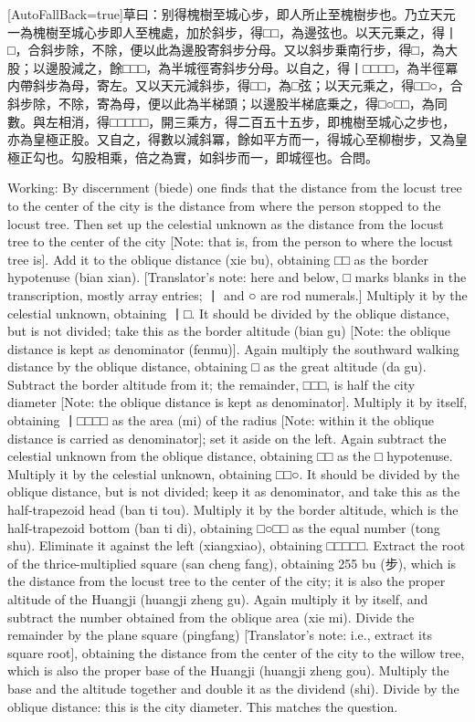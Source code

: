 \documentclass[11pt]{article}
\newcommand{\zhsmall}{\footnotesize\color{black!70}}
\newcommand{\unitlabel}[1]{\marginpar{\raggedleft\tiny\color{gray}#1}}
\newenvironment{unitzh}{\par\CJKfontspec{Noto Serif CJK SC}[AutoFallBack=true]\large\linespread{1.25}\selectfont}{\par}
\newenvironment{uniten}{\par\small\color{black!85}}{\par\medskip}
\begin{document}
\begin{unitzh}\unitlabel{ceyuan-016.1}草曰：别得槐樹至城心步，即人所止至槐樹步也。乃立天元一為槐樹至城心步{\zhsmall 即人至槐處}，加於斜步，得□□，為邊弦也。以天元乗之，得丨□，合斜步除，不除，便以此為邊股{\zhsmall 寄斜步分母}。又以斜步乗南行步，得□，為大股；以邊股減之，餘□□□，為半城徑{\zhsmall 寄斜步分母}。以自之，得丨□□□□，為半徑冪{\zhsmall 内帶斜步為母}，寄左。又以天元減斜歩，得□□，為□弦；以天元乘之，得□□○，合斜步除，不除，寄為母，便以此為半梯頭；以邊股半梯底乗之，得□○□□，為同數。與左相消，得□□□□□，開三乘方，得二百五十五步，即槐樹至城心之步也，亦為皇極正股。又自之，得數以減斜冪，餘如平方而一，得城心至柳樹步，又為皇極正勾也。勾股相乘，倍之為實，如斜步而一，即城徑也。合問。\end{unitzh}
\begin{uniten}Working: By discernment (biede) one finds that the distance from the locust tree to the center of the city is the distance from where the person stopped to the locust tree. Then set up the celestial unknown as the distance from the locust tree to the center of the city [Note: that is, from the person to where the locust tree is]. Add it to the oblique distance (xie bu), obtaining □□ as the border hypotenuse (bian xian). [Translator's note: here and below, □ marks blanks in the transcription, mostly array entries; 丨 and ○ are rod numerals.] Multiply it by the celestial unknown, obtaining 丨□. It should be divided by the oblique distance, but is not divided; take this as the border altitude (bian gu) [Note: the oblique distance is kept as denominator (fenmu)]. Again multiply the southward walking distance by the oblique distance, obtaining □ as the great altitude (da gu). Subtract the border altitude from it; the remainder, □□□, is half the city diameter [Note: the oblique distance is kept as denominator]. Multiply it by itself, obtaining 丨□□□□ as the area (mi) of the radius [Note: within it the oblique distance is carried as denominator]; set it aside on the left. Again subtract the celestial unknown from the oblique distance, obtaining □□ as the □ hypotenuse. Multiply it by the celestial unknown, obtaining □□○. It should be divided by the oblique distance, but is not divided; keep it as denominator, and take this as the half-trapezoid head (ban ti tou). Multiply it by the border altitude, which is the half-trapezoid bottom (ban ti di), obtaining □○□□ as the equal number (tong shu). Eliminate it against the left (xiangxiao), obtaining □□□□□. Extract the root of the thrice-multiplied square (san cheng fang), obtaining 255 bu (步), which is the distance from the locust tree to the center of the city; it is also the proper altitude of the Huangji (huangji zheng gu). Again multiply it by itself, and subtract the number obtained from the oblique area (xie mi). Divide the remainder by the plane square (pingfang) [Translator's note: i.e., extract its square root], obtaining the distance from the center of the city to the willow tree, which is also the proper base of the Huangji (huangji zheng gou). Multiply the base and the altitude together and double it as the dividend (shi). Divide by the oblique distance: this is the city diameter. This matches the question.\end{uniten}
\end{document}
